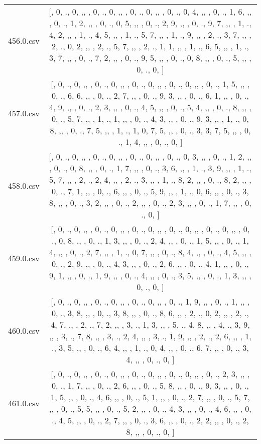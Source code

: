 \begin{table}[ht]
\begin{tabular}{@{}c c@{}}
	456.0.csv & [, 0, ., 0, ,,  , 0, ., 0, ,,  , 0, ., 0, ,,  , 0, ., 0, 4, ,,  , 0, ., 1, 6, ,,  , 0, ., 1, 2, ,,  , 0, ., 0, 5, ,,  , 0, ., 2, 9, ,,  , 0, ., 9, 7, ,,  , 1, ., 4, 2, ,,  , 1, ., 4, 5, ,,  , 1, ., 5, 7, ,,  , 1, ., 9, ,,  , 2, ., 3, 7, ,,  , 2, ., 0, 2, ,,  , 2, ., 5, 7, ,,  , 2, ., 1, 1, ,,  , 1, ., 6, 5, ,,  , 1, ., 3, 7, ,,  , 0, ., 7, 2, ,,  , 0, ., 9, 5, ,,  , 0, ., 0, 8, ,,  , 0, ., 5, ,,  , 0, ., 0, ]\\ 
	457.0.csv & [, 0, ., 0, ,,  , 0, ., 0, ,,  , 0, ., 0, ,,  , 0, ., 0, ,,  , 0, ., 1, 5, ,,  , 0, ., 6, 6, ,,  , 0, ., 2, 7, ,,  , 0, ., 9, 3, ,,  , 0, ., 6, 1, ,,  , 0, ., 4, 9, ,,  , 0, ., 2, 3, ,,  , 0, ., 4, 5, ,,  , 0, ., 5, 4, ,,  , 0, ., 8, ,,  , 0, ., 5, 7, ,,  , 1, ., 1, ,,  , 0, ., 4, 3, ,,  , 0, ., 9, 3, ,,  , 1, ., 0, 8, ,,  , 0, ., 7, 5, ,,  , 1, ., 1, 0, 7, 5, ,,  , 0, ., 3, 3, 7, 5, ,,  , 0, ., 1, 4, ,,  , 0, ., 0, ]\\ 
	458.0.csv & [, 0, ., 0, ,,  , 0, ., 0, ,,  , 0, ., 0, ,,  , 0, ., 0, 3, ,,  , 0, ., 1, 2, ,,  , 0, ., 0, 8, ,,  , 0, ., 1, 7, ,,  , 0, ., 3, 6, ,,  , 1, ., 3, 9, ,,  , 1, ., 5, 7, ,,  , 2, ., 2, 4, ,,  , 2, ., 3, ,,  , 1, ., 8, 2, ,,  , 0, ., 8, 2, ,,  , 0, ., 7, 1, ,,  , 0, ., 6, ,,  , 0, ., 5, 9, ,,  , 1, ., 0, 6, ,,  , 0, ., 3, 8, ,,  , 0, ., 3, 2, ,,  , 0, ., 2, ,,  , 0, ., 2, 3, ,,  , 0, ., 1, 7, ,,  , 0, ., 0, ]\\ 
	459.0.csv & [, 0, ., 0, ,,  , 0, ., 0, ,,  , 0, ., 0, ,,  , 0, ., 0, ,,  , 0, ., 0, ,,  , 0, ., 0, 8, ,,  , 0, ., 1, 3, ,,  , 0, ., 2, 4, ,,  , 0, ., 1, 5, ,,  , 0, ., 1, 4, ,,  , 0, ., 2, 7, ,,  , 1, ., 0, 7, ,,  , 0, ., 8, 4, ,,  , 0, ., 4, 5, ,,  , 0, ., 2, 9, ,,  , 0, ., 4, 3, ,,  , 0, ., 2, 6, ,,  , 0, ., 4, 1, ,,  , 0, ., 9, 1, ,,  , 0, ., 1, 9, ,,  , 0, ., 4, ,,  , 0, ., 3, 5, ,,  , 0, ., 1, 3, ,,  , 0, ., 0, ]\\ 
	460.0.csv & [, 0, ., 0, ,,  , 0, ., 0, ,,  , 0, ., 0, ,,  , 0, ., 1, 9, ,,  , 0, ., 1, ,,  , 0, ., 3, 8, ,,  , 0, ., 3, 8, ,,  , 0, ., 8, 6, ,,  , 2, ., 0, 2, ,,  , 2, ., 4, 7, ,,  , 2, ., 7, 2, ,,  , 3, ., 1, 3, ,,  , 5, ., 4, 8, ,,  , 4, ., 3, 9, ,,  , 3, ., 7, 8, ,,  , 3, ., 2, 4, ,,  , 3, ., 1, 9, ,,  , 2, ., 2, 6, ,,  , 1, ., 3, 5, ,,  , 0, ., 6, 4, ,,  , 1, ., 0, 4, ,,  , 0, ., 6, 7, ,,  , 0, ., 3, 4, ,,  , 0, ., 0, ]\\ 
	461.0.csv & [, 0, ., 0, ,,  , 0, ., 0, ,,  , 0, ., 0, ,,  , 0, ., 0, ,,  , 0, ., 2, 3, ,,  , 0, ., 1, 7, ,,  , 0, ., 2, 6, ,,  , 0, ., 5, 8, ,,  , 0, ., 9, 3, ,,  , 0, ., 1, 5, ,,  , 0, ., 4, 6, ,,  , 0, ., 5, 1, ,,  , 0, ., 2, 7, ,,  , 0, ., 5, 7, ,,  , 0, ., 5, 5, ,,  , 0, ., 5, 2, ,,  , 0, ., 4, 3, ,,  , 0, ., 4, 6, ,,  , 0, ., 4, 5, ,,  , 0, ., 2, 7, ,,  , 0, ., 3, 6, ,,  , 0, ., 2, 2, ,,  , 0, ., 2, 8, ,,  , 0, ., 0, ]\\ 

\end{tabular}
\end{table}
